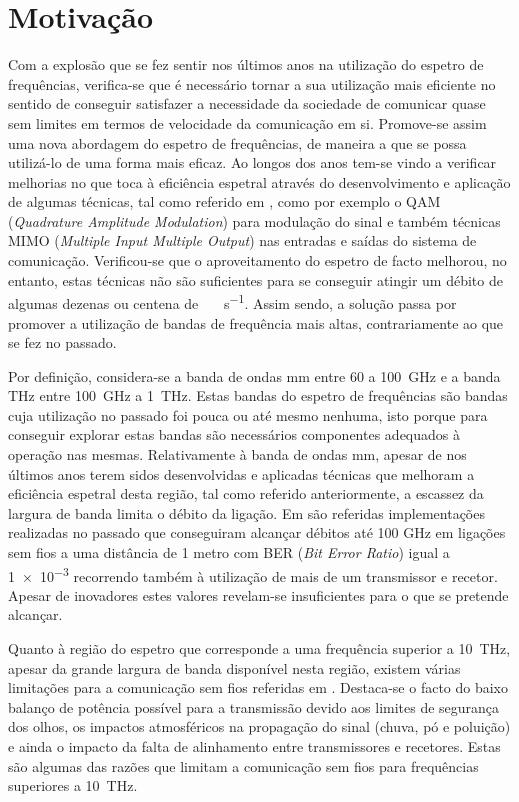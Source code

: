 \section{Motivação} \label{sec:goals}
Com a explosão que se fez sentir nos últimos anos na utilização do espetro de frequências, verifica-se que é necessário tornar a sua utilização mais eficiente no sentido de conseguir satisfazer a necessidade da sociedade de comunicar quase sem limites em termos de velocidade da comunicação em si. Promove-se assim uma nova abordagem do espetro de frequências, de maneira a que se possa utilizá-lo de uma forma mais eficaz.  
Ao longos dos anos tem-se vindo a verificar melhorias no que toca à eficiência espetral através do desenvolvimento e aplicação de algumas técnicas, tal como referido em \cite{R007}, como por exemplo o QAM (\textit{Quadrature Amplitude Modulation}) para modulação do sinal e também técnicas MIMO (\textit{Multiple Input Multiple Output}) nas entradas e saídas do sistema de comunicação. Verificou-se que o aproveitamento do espetro de facto melhorou, no entanto, estas técnicas não são suficientes para se conseguir atingir um débito de algumas dezenas ou centena de \SI{}{\giga\bit\per\second}. Assim sendo, a solução passa por promover a utilização de bandas de frequência mais altas, contrariamente ao que se fez no passado.  

Por definição, considera-se a banda de ondas mm entre 60 a \SI{100}{\giga\hertz} e a banda THz entre \SI{100}{\giga\hertz} a \SI{1}{\tera\hertz}. Estas bandas do espetro de frequências são bandas cuja utilização no passado foi pouca ou até mesmo nenhuma, isto porque para conseguir explorar estas bandas são necessários componentes adequados à operação nas mesmas. Relativamente à banda de ondas mm, apesar de nos últimos anos terem sidos desenvolvidas e aplicadas técnicas que melhoram a eficiência espetral desta região, tal como referido anteriormente, a escassez da largura de banda limita o débito da ligação. Em \cite{R007} são referidas implementações realizadas no passado que conseguiram alcançar débitos até 100 GHz em ligações sem fios a uma distância de 1 metro com BER (\textit{Bit Error Ratio}) igual a \num{1e-3} recorrendo também à utilização de mais de um transmissor e recetor. Apesar de inovadores estes valores revelam-se insuficientes para o que se pretende alcançar. 

Quanto à região do espetro que corresponde a uma frequência superior a \SI{10}{\tera\hertz}, apesar da grande largura de banda disponível nesta região, existem várias limitações para a comunicação sem fios referidas em \cite{R005}. Destaca-se o facto do baixo balanço de potência possível para a transmissão devido aos limites de segurança dos olhos, os impactos atmosféricos na propagação do sinal (chuva, pó e poluição) e ainda o impacto da falta de alinhamento entre transmissores e recetores. Estas são algumas das razões que limitam a comunicação sem fios para frequências superiores a \SI{10}{\tera\hertz}.

